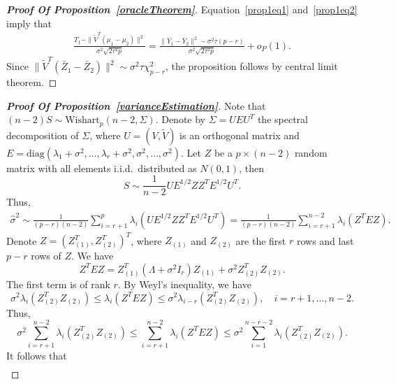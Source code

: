 \documentclass[review]{elsarticle}
\theoremstyle{plain}
\theoremstyle{definition}
\theoremstyle{remark}
\begin{document}
\begin{proof}[\textbf{Proof Of Proposition~\ref{oracleTheorem}}]
    Equation~\eqref{prop1eq1} and~\eqref{prop1eq2} imply that
    \begin{equation}
        \begin{aligned}
            \frac{T_1-\|\tilde{V}^T(\mu_1-\mu_2)\|^2}{\sigma^2\sqrt{2\tau^2 p}}
            =
            \frac{\|\bar{Y}_1-\bar{Y}_2\|^2-
                \sigma^2 \tau (p-r)}{\sigma^2\sqrt{2\tau^2 p}}
                +o_P(1).
        \end{aligned}
    \end{equation}
    Since
$\|\tilde{V}^T(\bar{Z}_1-\bar{Z}_2)\|^2\sim \sigma^2\tau\chi^2_{p-r}$,
the proposition follows by central limit theorem.
\end{proof}



\begin{proof}[\textbf{Proof Of Proposition~\ref{varianceEstimation}}]
    Note that $(n-2)S\sim \mathrm{Wishart}_p (n-2,\Sigma)$.
    Denote by $\Sigma=UEU^T$ the spectral decomposition of $\Sigma$, where $U=(V,\tilde{V})$ is an orthogonal matrix and $E=\mathrm{diag}(\lambda_1+\sigma^2,\ldots,\lambda_r+\sigma^2,\sigma^2,\ldots,\sigma^2)$.
    Let $Z$ be a $p\times (n-2)$ random matrix with all elements i.i.d.\ distributed as $N(0,1)$, then
    $$
        S\sim \frac{1}{n-2} U E^{1/2} Z Z^T E^{1/2} U^T.
    $$
    Thus,
    \begin{equation*}
        \begin{aligned}
            \hat{\sigma}^2\sim
            \frac{1}{(p-r)(n-2)}\sum_{i=r+1}^p \lambda_i (U E^{1/2} Z Z^T E^{1/2} U^T)
            =
            \frac{1}{(p-r)(n-2)}\sum_{i=r+1}^{n-2} \lambda_i ( Z^T E Z).
        \end{aligned}
    \end{equation*}
    Denote $Z={(Z_{(1)}^T,Z_{(2)}^T)}^T$, where $Z_{(1)}$ and $Z_{(2)}$ are the first $r$ rows and last $p-r$ rows of $Z$. We have
    $$
    Z^T E Z =Z_{(1)}^T (\Lambda +\sigma^2 I_r) Z_{(1)}+\sigma^2 Z_{(2)}^T Z_{(2)}.
    $$
 The first term is of rank $r$. By Weyl's inequality, we have
    $$
    \sigma^2\lambda_i(Z_{(2)}^T Z_{(2)}) \leq \lambda_i(Z^T E Z)\leq
    \sigma^2\lambda_{i-r}(Z_{(2)}^T Z_{(2)}),
    \quad
    \textrm{$i=r+1,\ldots, n-2$}.
    $$
    Thus,
    $$
    \sigma^2\sum_{i=r+1}^{n-2}\lambda_i(Z_{(2)}^T Z_{(2)}) \leq \sum_{i=r+1}^{n-2}\lambda_i(Z^T E Z)\leq
    \sigma^2\sum_{i=1}^{n-r-2}\lambda_{i}(Z_{(2)}^T Z_{(2)}).
    $$
     It follows that
     \begin{equation*}
         \begin{aligned}

\end{aligned}
\end{equation*}
\end{proof}
\end{document}
